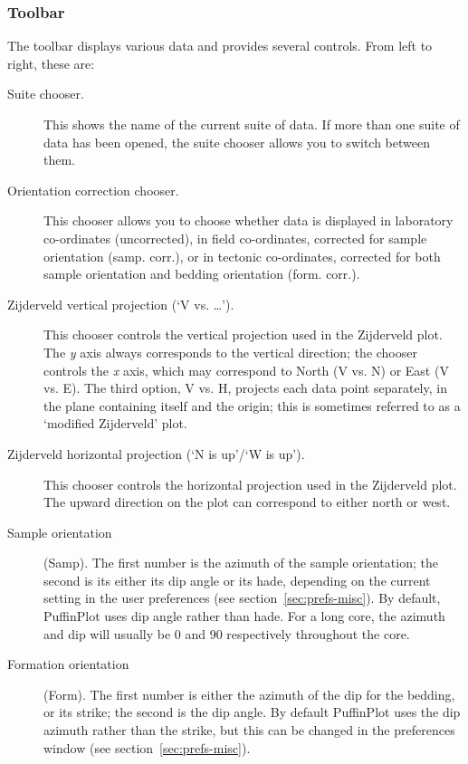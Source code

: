 \documentclass[a4paper,british]{article}
\newcommand{\ppcmd}[1]{\textsf{#1}} %
\begin{document}
\subsubsection{\label{sec:toolbar}Toolbar}

The toolbar displays various data and provides several controls.
From left to right, these are:

\begin{description}

\item[Suite chooser.] This shows the name of the current suite of data. If
  more than one suite of data has been opened, the suite chooser allows you
  to switch between them.

\item[Orientation correction chooser.] This chooser allows you to choose
  whether data is displayed in laboratory co-ordinates (\ppcmd{uncorrected}),
  in field co-ordinates, corrected for sample orientation (\ppcmd{samp.
    corr.}), or in tectonic co-ordinates, corrected for both sample
  orientation and bedding orientation (\ppcmd{form. corr.}).

\item[Zijderveld vertical projection (`V vs. \ldots').] This chooser
  controls the vertical projection used in the Zijderveld plot. The {\em
    y} axis always corresponds to the vertical direction; the chooser
  controls the {\em x} axis, which may correspond to North (\ppcmd{V vs.
    N}) or East (\ppcmd{V vs. E}). The third option, \ppcmd{V vs. H},
  projects each data point separately, in the plane containing itself
  and the origin; this is sometimes referred to as a `modified
  Zijderveld' plot.

\item[Zijderveld horizontal projection (`N is up'/`W is up').] This
  chooser controls the horizontal projection used in the Zijderveld
  plot. The upward direction on the plot can correspond to either 
  north or west.

\item[Sample orientation] (\ppcmd{Samp}). The first number is the azimuth of
  the sample orientation; the second is its either its dip angle or its hade,
  depending on the current setting in the user preferences (see
  section~\ref{sec:prefs-misc}). By default, PuffinPlot uses dip angle rather
  than hade. For a long core, the azimuth and dip will usually be 0 and 90
  respectively throughout the core.

\item[Formation orientation] (\ppcmd{Form}). The first number is either the
  azimuth of the dip for the bedding, or its strike; the second is the dip
  angle. By default PuffinPlot uses the dip azimuth rather than the strike,
  but this can be changed in the preferences window (see
  section~\ref{sec:prefs-misc}).


\end{description}
\end{document}
